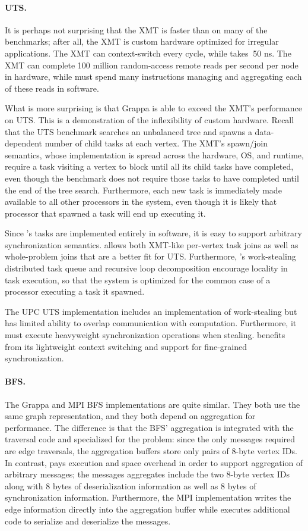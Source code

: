 \paragraph{UTS.}
It is perhaps not surprising that the XMT is faster than
\Grappa on many of the benchmarks; after all, the XMT is custom
hardware optimized for irregular applications. The XMT can
context-switch every cycle, while \Grappa takes $~$50 ns. The XMT can
complete 100 million random-access remote reads per second per node in
hardware, while \Grappa must spend many instructions managing and
aggregating each of these reads in software.

What is more surprising is that Grappa is able to exceed the XMT's
performance on UTS. This is a demonstration of the inflexibility of
custom hardware. Recall that the UTS benchmark searches an unbalanced
tree and spawns a data-dependent number of child tasks at each
vertex. The XMT's spawn/join semantics, whose implementation is spread
across the hardware, OS, and runtime, require a task visiting a vertex
to block until all its child tasks have completed, even though the
benchmark does not require those tasks to have completed until the end
of the tree search. Furthermore, each new task is immediately made
available to all other processors in the system, even though it is
likely that processor that spawned a task will end up executing it.

Since \Grappa's tasks are implemented entirely in software, it is easy
to support arbitrary synchronization semantics. \Grappa allows both
XMT-like per-vertex task joins as well as whole-problem joins that are
a better fit for UTS. Furthermore, \Grappa's work-stealing distributed
task queue and recursive loop decomposition encourage locality in task
execution, so that the system is optimized for the common case of a
processor executing a task it spawned.

The UPC UTS implementation includes an implementation of work-stealing
but has limited ability to overlap communication with
computation. Furthermore, it must execute heavyweight synchronization
operations when stealing. \Grappa benefits from its lightweight
context switching and support for fine-grained synchronization.

\paragraph{BFS.}
The Grappa and MPI BFS implementations are quite similar. They both
use the same graph representation, and they both depend on aggregation
for performance. The difference is that the BFS' aggregation is
integrated with the traversal code and specialized for the problem:
since the only messages required are edge traversals, the aggregation
buffers store only pairs of 8-byte vertex IDs.  In contrast, \Grappa
pays execution and space overhead in order to support aggregation of
arbitrary messages; the messages \Grappa aggregates include the two
8-byte vertex IDs along with 8 bytes of deserialization information as
well as 8 bytes of synchronization information. Furthermore, the MPI
implementation writes the edge information directly into the
aggregation buffer while \Grappa executes additional code to serialize
and deserialize the messages.

